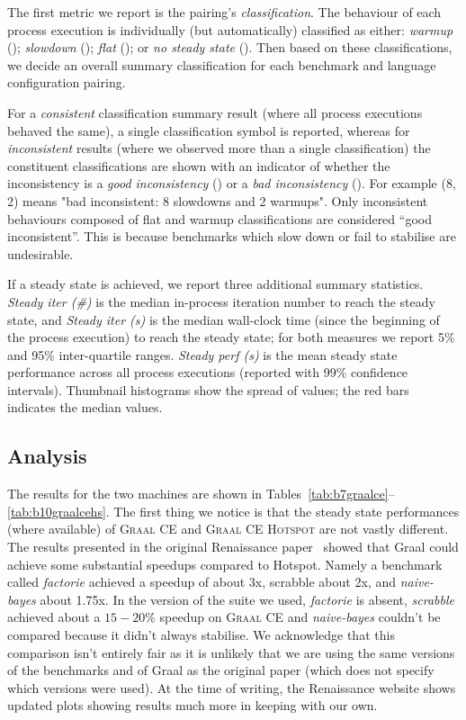 \documentclass[a4paper]{article}
\newcommand{\graalce}{\textsc{Graal CE}\xspace}
\newcommand{\graalcehs}{\textsc{Graal CE Hotspot}\xspace}
\begin{document}
The first metric we report is the pairing's \emph{classification}. The
behaviour of each process execution is individually (but automatically) classified as either:
\emph{warmup} (\warmup); \emph{slowdown} (\slowdown); \emph{flat} (\flatc); or
\emph{no steady state} (\nosteadystate). Then based on these classifications,
we decide an overall summary classification for each benchmark and language
configuration pairing.

For a \emph{consistent} classification summary result (where all process
executions behaved the same), a single classification symbol is reported,
whereas for \emph{inconsistent} results (where we observed more than a single
classification) the constituent classifications are shown with an indicator of
whether the inconsistency is a \emph{good inconsistency} (\goodinconsistent)
or a \emph{bad inconsistency} (\badinconsistent). For example
\badinconsistent(8\slowdown, 2\warmup) means "bad inconsistent: 8 slowdowns
and 2 warmups". Only inconsistent behaviours composed of flat and warmup
classifications are considered ``good inconsistent''. This is because
benchmarks which slow down or fail to stabilise are undesirable.

If a steady state is achieved, we report three additional summary statistics.
\emph{Steady iter (\#)} is the median in-process iteration number to reach the
steady state, and \emph{Steady iter (s)} is the median wall-clock time (since
the beginning of the process execution) to reach the steady state; for both
measures we report 5\% and 95\% inter-quartile ranges. \emph{Steady perf (s)}
is the mean steady state performance across all process executions (reported
with 99\% confidence intervals). Thumbnail histograms show the spread of
values; the red bars indicates the median values.

\subsection{Analysis}

The results for the two machines are shown in
Tables~\ref{tab:b7graalce}--\ref{tab:b10graalcehs}. The first thing we notice
is that the steady state performances (where
available) of \graalce and \graalcehs are not vastly different. The results
presented in the original Renaissance paper~\cite{prokopec19renaissance} showed
that Graal could achieve some substantial speedups compared to Hotspot. Namely
a benchmark called \emph{factorie} achieved a speedup of about 3x, scrabble
about 2x, and \emph{naive-bayes} about 1.75x. In the version of the suite we
used, \emph{factorie} is absent, \emph{scrabble} achieved about a $15-20\%$
speedup on \graalce and \emph{naive-bayes} couldn't be compared because it
didn't always stabilise. We acknowledge that this comparison isn't entirely
fair as it is unlikely that we are using the same versions of the benchmarks
and of Graal as the original paper (which does not specify which versions were
used). At the time of writing, the Renaissance website shows updated plots
showing results much more in keeping with our own.
\end{document}
